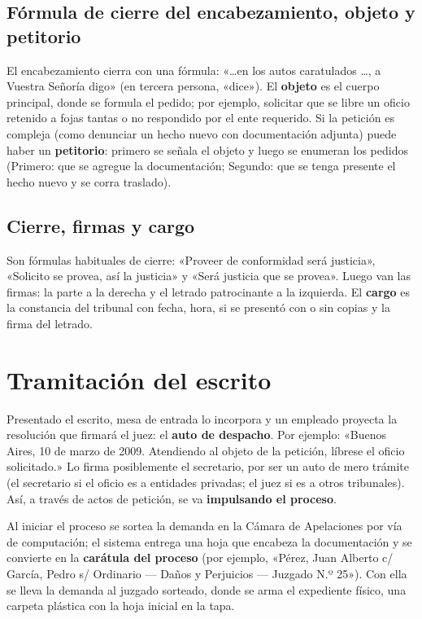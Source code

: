 \documentclass[12pt,oneside]{book}
\begin{document}
\subsection{Fórmula de cierre del encabezamiento, objeto y petitorio}

El encabezamiento cierra con una fórmula: «\ldots en los autos caratulados \ldots, a Vuestra Señoría digo» (en tercera persona, «dice»). El \textbf{objeto} es el cuerpo principal, donde se formula el pedido; por ejemplo, solicitar que se libre un oficio retenido a fojas tantas o no respondido por el ente requerido. Si la petición es compleja (como denunciar un hecho nuevo con documentación adjunta) puede haber un \textbf{petitorio}: primero se señala el objeto y luego se enumeran los pedidos (Primero: que se agregue la documentación; Segundo: que se tenga presente el hecho nuevo y se corra traslado).

\subsection{Cierre, firmas y cargo}

Son fórmulas habituales de cierre: «Proveer de conformidad será justicia», «Solicito se provea, así la justicia» y «Será justicia que se provea». Luego van las firmas: la parte a la derecha y el letrado patrocinante a la izquierda. El \textbf{cargo} es la constancia del tribunal con fecha, hora, si se presentó con o sin copias y la firma del letrado.

\section{Tramitación del escrito}

Presentado el escrito, mesa de entrada lo incorpora y un empleado proyecta la resolución que firmará el juez: el \textbf{auto de despacho}. Por ejemplo: «Buenos Aires, 10 de marzo de 2009. Atendiendo al objeto de la petición, líbrese el oficio solicitado.» Lo firma posiblemente el secretario, por ser un auto de mero trámite (el secretario si el oficio es a entidades privadas; el juez si es a otros tribunales). Así, a través de actos de petición, se va \textbf{impulsando el proceso}.

Al iniciar el proceso se sortea la demanda en la Cámara de Apelaciones por vía de computación; el sistema entrega una hoja que encabeza la documentación y se convierte en la \textbf{carátula del proceso} (por ejemplo, «Pérez, Juan Alberto c/ García, Pedro s/ Ordinario --- Daños y Perjuicios --- Juzgado N.º 25»). Con ella se lleva la demanda al juzgado sorteado, donde se arma el expediente físico, una carpeta plástica con la hoja inicial en la tapa.
\end{document}
